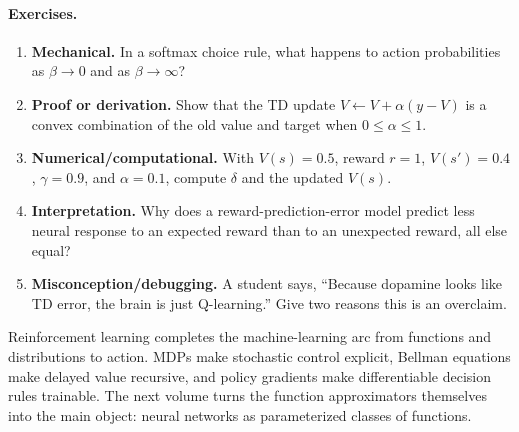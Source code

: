 \paragraph{Exercises.}
\begin{enumerate}[label=\textbf{36.4.\arabic*.}, leftmargin=*]
\item \textbf{Mechanical.} In a softmax choice rule, what happens to action probabilities as \(\beta\to0\) and as \(\beta\to\infty\)?
\item \textbf{Proof or derivation.} Show that the TD update \(V\leftarrow V+\alpha(y-V)\) is a convex combination of the old value and target when \(0\leq\alpha\leq1\).
\item \textbf{Numerical/computational.} With \(V(s)=0.5\), reward \(r=1\), \(V(s')=0.4\), \(\gamma=0.9\), and \(\alpha=0.1\), compute \(\delta\) and the updated \(V(s)\).
\item \textbf{Interpretation.} Why does a reward-prediction-error model predict less neural response to an expected reward than to an unexpected reward, all else equal?
\item \textbf{Misconception/debugging.} A student says, ``Because dopamine looks like TD error, the brain is just Q-learning.'' Give two reasons this is an overclaim.
\end{enumerate}

Reinforcement learning completes the machine-learning arc from functions and distributions to action. MDPs make stochastic control explicit, Bellman equations make delayed value recursive, and policy gradients make differentiable decision rules trainable. The next volume turns the function approximators themselves into the main object: neural networks as parameterized classes of functions.

\clearpage
